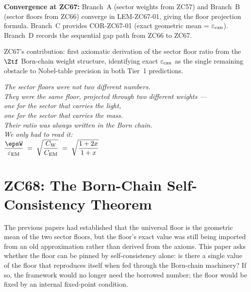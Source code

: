 \documentclass[12pt, a4paper]{article}
\renewcommand{\epsEM}{\varepsilon_{\rm EM}}
\renewcommand{\epscan}{\varepsilon_{\rm can}}
\begin{document}
\begin{genealogybox}[title={How ZC67's Key Objects Trace Back}]
\textbf{Convergence at ZC67:}
Branch~A (sector weights from ZC57) and Branch~B (sector floors
from ZC66) converge in LEM-ZC67-01, giving the floor projection
formula.
Branch~C provides COR-ZC67-01 (exact geometric mean = $\epscan$).
Branch~D records the sequential gap path from ZC66 to ZC67.

ZC67's contribution: first axiomatic derivation of the sector
floor ratio from the $\Ztf$ Born-chain weight structure,
identifying exact $\epscan$ as the single remaining obstacle
to Nobel-table precision in both Tier~1 predictions.
\end{genealogybox}


\bigskip
\begin{center}
\textit{%
  The sector floors were not two different numbers.\\
  They were the same floor, projected through two different weights ---\\
  one for the sector that carries the light,\\
  one for the sector that carries the mass.\\[0.5em]
  Their ratio was always written in the Born chain.\\
  We only had to read it:\\[0.5em]
  $\displaystyle
  \frac{\epsW}{\epsEM}
  \;=\;
  \sqrt{\frac{C_{\rm W}}{C_{\rm EM}}}
  \;=\;
  \sqrt{\frac{1+2x}{1+x}}
  $
}
\end{center}



\section{ZC68: The Born-Chain Self-Consistency Theorem}

The previous papers had established that the universal floor is the geometric
mean of the two sector floors, but the floor's exact value was still being
imported from an old approximation rather than derived from the axioms. This
paper asks whether the floor can be pinned by self-consistency alone: is there
a single value of the floor that reproduces itself when fed through the
Born-chain machinery? If so, the framework would no longer need the borrowed
number; the floor would be fixed by an internal fixed-point condition.
\end{document}
